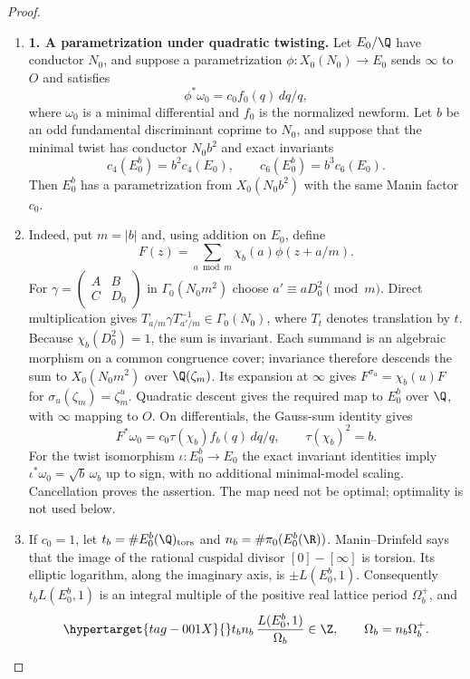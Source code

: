 \begin{proof}
\begin{enumerate}[label=\arabic*.,leftmargin=*]
\item \textbf{1. A parametrization under quadratic twisting.}
Let $E_0/\Q$ have conductor $N_0$, and suppose a parametrization
$\phi:X_0(N_0)\to E_0$ sends $\infty$ to $O$ and satisfies
\[
 \phi^*\omega_0=c_0f_0(q)\,dq/q,
\]
where $\omega_0$ is a minimal differential and $f_0$ is the normalized
newform. Let $b$ be an odd fundamental discriminant coprime to $N_0$,
and suppose that the minimal twist has conductor $N_0b^2$ and exact
invariants
\[
 c_4(E_0^b)=b^2c_4(E_0),\qquad
 c_6(E_0^b)=b^3c_6(E_0).
\]
Then $E_0^b$ has a parametrization from $X_0(N_0b^2)$ with the same
Manin factor $c_0$.

\item Indeed, put $m=|b|$ and, using addition on $E_0$, define
\[
 F(z)=\sum_{a\bmod m}\chi_b(a)\phi(z+a/m).
\]
For $\gamma=\left(\begin{smallmatrix}A&B\\C&D_0\end{smallmatrix}\right)$
in $\Gamma_0(N_0m^2)$ choose $a'\equiv aD_0^2\pmod m$.
Direct multiplication gives
$T_{a/m}\gamma T_{a'/m}^{-1}\in\Gamma_0(N_0)$, where $T_t$
denotes translation by $t$. Because $\chi_b(D_0^2)=1$, the sum is
invariant. Each summand is an algebraic morphism on a common
congruence cover; invariance therefore descends the sum to
$X_0(N_0m^2)$ over $\Q(\zeta_m)$. Its expansion at $\infty$
gives $F^{\sigma_u}=\chi_b(u)F$ for
$\sigma_u(\zeta_m)=\zeta_m^u$. Quadratic descent gives the required
map to $E_0^b$ over $\Q$, with $\infty$ mapping to $O$.
On differentials, the Gauss-sum identity gives
\[
 F^*\omega_0=c_0\tau(\chi_b)f_b(q)\,dq/q,
 \qquad \tau(\chi_b)^2=b.
\]
For the twist isomorphism $\iota:E_0^b\to E_0$ the exact invariant
identities imply
$\iota^*\omega_0=\sqrt b\,\omega_b$ up to sign, with no additional
minimal-model scaling. Cancellation proves the assertion. The map
need not be optimal; optimality is not used below.

\item If $c_0=1$, let $t_b=\#E_0^b(\Q)_{\rm tors}$ and
$n_b=\#\pi_0(E_0^b(\R))$. Manin--Drinfeld \citep[Section~1, unnumbered theorem, p.~83 of the Russian original]{Drinfeld1973} says that the image of
the rational cuspidal divisor $[0]-[\infty]$ is torsion. Its elliptic
logarithm, along the imaginary axis, is $\pm L(E_0^b,1)$.
Consequently $t_bL(E_0^b,1)$ is an integral multiple of the positive
real lattice period $\Omega_b^+$, and
\begin{equation}\hypertarget{tag-001X}{}\label{ari:eq:Cgz-central-integrality}
 t_bn_b\,\frac{L(E_0^b,1)}{\Omega_b}\in\Z,
 \qquad \Omega_b=n_b\Omega_b^+.
\end{equation}


\end{enumerate}
\end{proof}
